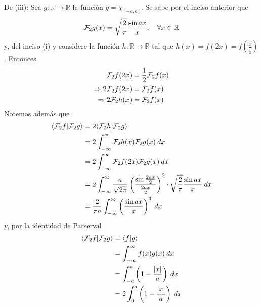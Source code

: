 \documentclass[12pt]{report}
\newcounter{it}
\theoremstyle{largebreak}
\newcommand\abs[1]{\ensuremath{\left|#1\right|}}
\newcommand\cf[3]{\ensuremath{#1:#2\rightarrow#3}}
\newcommand\pint[2]{\ensuremath{\langle#1| #2\rangle}}
\newcommand{\fou}[1]{\ensuremath{\mathcal{F}#1}}
\begin{document}
\begin{sol}
        De (iii): Sea $\cf{g}{\mathbb{R}}{\mathbb{R}}$ la función $g=\chi_{[-a,a]}$. Se sabe por el inciso anterior que
        \begin{equation*}
            \fou_2{g}(x)=\sqrt{\frac{2}{\pi}}\frac{\sin ax}{x},\quad\forall x\in\mathbb{R}
        \end{equation*}
        y, del inciso (i) y considere la función $\cf{h}{\mathbb{R}}{\mathbb{R}}$ tal que $h(x)=f(2x)=f\left(\frac{x}{\frac{1}{2}}\right)$. Entonces
        \begin{equation*}
            \begin{split}
                \fou_2{f}(2x)&=\frac{1}{2}\fou_2{f}(x)\\
                \Rightarrow 2\fou_2{f}(2x)&=\fou_2{f}(x)\\
                \Rightarrow 2\fou_2{h}(x)&=\fou_2{f}(x)\\
            \end{split}
        \end{equation*}
        Notemos además que
        \begin{equation*}
            \begin{split}
                \pint{\fou_2{f}}{\fou_2{g}}&=2\pint{\fou_2{h}}{\fou_2{g}}\\
                &=2\int_{-\infty}^\infty \fou_2{h}(x)\fou_2{g}(x)\:dx\\
                &=2\int_{ -\infty}^{\infty}\fou_2{f}(2x)\fou_2{g}(x)\:dx\\
                &=2\int_{-\infty}^{\infty}\frac{a}{\sqrt{2\pi}}\left(\frac{\sin\frac{2ax}{2}}{\frac{2ax}{2}} \right)^2\cdot\sqrt{\frac{2}{\pi}}\frac{\sin ax}{x}\:dx\\
                &=\frac{2}{\pi a}\int_{-\infty}^{\infty}\left(\frac{\sin ax}{x}\right)^3\:dx\\
            \end{split}
        \end{equation*}
        y, por la identidad de Parserval
        \begin{equation*}
            \begin{split}
                \pint{\fou_2{f}}{\fou_2{g}}&=\pint{f}{g}\\
                &=\int_{-\infty}^\infty f(x)g(x)\:dx\\
                &=\int_{-a}^a \left(1-\frac{\abs{x}}{a}\right)\:dx\\
                &=2\int_{0}^a \left(1-\frac{\abs{x}}{a}\right)\:dx\\

\end{split}
\end{equation*}
\end{sol}
\end{document}
